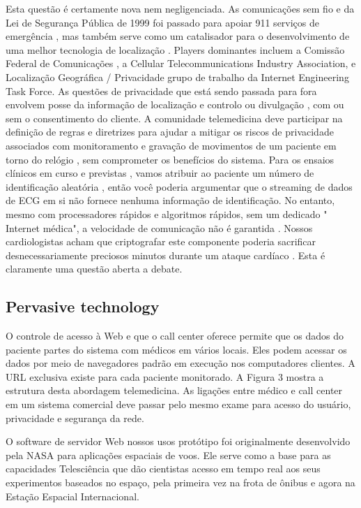 \documentclass[a4paper,12pt]{article}
\begin{document}
Esta questão é certamente nova nem negligenciada. As comunicações sem fio e da Lei de Segurança Pública de 1999 foi passado para apoiar 911 serviços de emergência , mas também serve como um catalisador para o desenvolvimento de uma melhor tecnologia de localização . Players dominantes incluem a Comissão Federal de Comunicações , a Cellular Telecommunications Industry Association, e Localização Geográfica / Privacidade grupo de trabalho da Internet Engineering Task Force. As questões de privacidade que está sendo passada para fora envolvem posse da informação de localização e controlo ou divulgação , com ou sem o consentimento do cliente. A comunidade telemedicina deve participar na definição de regras e diretrizes para ajudar a mitigar os riscos de privacidade associados com monitoramento e gravação de movimentos de um paciente em torno do relógio , sem comprometer os benefícios do sistema. Para os ensaios clínicos em curso e previstas , vamos atribuir ao paciente um número de identificação aleatória , então você poderia argumentar que o streaming de dados de ECG em si não fornece nenhuma informação de identificação. No entanto, mesmo com processadores rápidos e algoritmos rápidos, sem um dedicado " Internet médica", a velocidade de comunicação não é garantida . Nossos cardiologistas acham que criptografar este componente poderia sacrificar desnecessariamente preciosos minutos durante um ataque cardíaco . Esta é claramente uma questão aberta a debate.


\subsection{Pervasive technology}

O controle de acesso à Web e que o call center oferece permite que os dados do paciente partes do sistema com médicos em vários locais. Eles podem acessar os dados por meio de navegadores padrão em execução nos computadores clientes. A URL exclusiva existe para cada paciente monitorado. A Figura 3 mostra a estrutura desta abordagem telemedicina. As ligações entre médico e call center em um sistema comercial deve passar pelo mesmo exame para acesso do usuário, privacidade e segurança da rede.

O software de servidor Web nossos usos protótipo foi originalmente desenvolvido pela NASA para aplicações espaciais de voos. Ele serve como a base para as capacidades Telesciência que dão cientistas acesso em tempo real aos seus experimentos baseados no espaço, pela primeira vez na frota de ônibus e agora na Estação Espacial Internacional.
\end{document}
